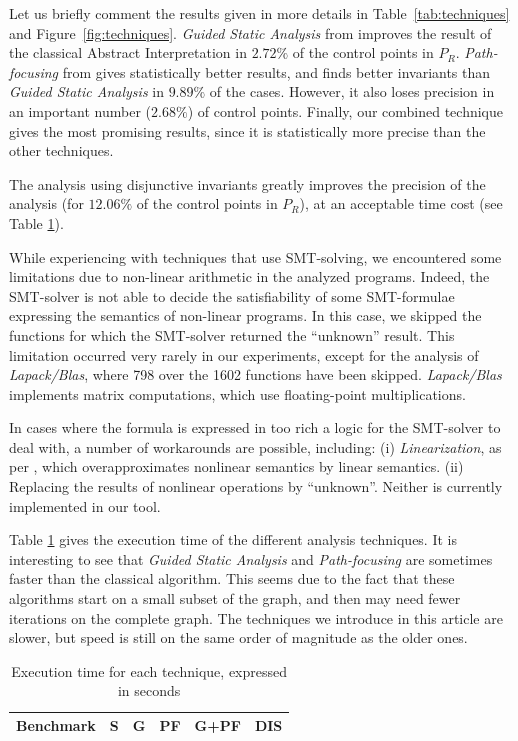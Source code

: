 \documentclass[preprint]{sigplanconf}
\begin{document}
Let us briefly comment the results given in more details in Table~\ref{tab:techniques} and Figure~\ref{fig:techniques}.
\emph{Guided Static Analysis} from \citet{DBLP:conf/sas/GopanR07} improves the
result of the classical Abstract Interpretation in $2.72\%$ of the control points
in $P_R$.
\emph{Path-focusing} from \citet{Monniaux_Gonnord_SAS11} gives
statistically better results, and finds better invariants than \emph{Guided
Static Analysis} in $9.89\%$ of the cases. However, it also loses precision in an
important number ($2.68\%$) of control points.
Finally, our combined technique gives the most promising results, since it is
statistically more precise than the other techniques.

The analysis using disjunctive invariants greatly improves the
precision of the analysis (for $12.06\%$ of the control points in $P_R$), at an
acceptable time cost (see Table \ref{tab:time}).

While experiencing with techniques that use SMT-solving, we encountered some
limitations due to non-linear arithmetic in the analyzed programs. Indeed, 
the SMT-solver is not able to decide the satisfiability of some SMT-formulae
expressing the semantics of non-linear programs. 
In this case, we skipped the functions for which the SMT-solver returned the
``unknown'' result.
This limitation occurred very rarely in our experiments, except for the analysis
of \emph{Lapack/Blas}, where 798 over the 1602 functions have been skipped.
\emph{Lapack/Blas} implements matrix computations, which use floating-point multiplications.

In cases where the formula is expressed in too rich a logic for the SMT-solver to deal with, a number of workarounds are possible, including:
(i) \emph{Linearization}, as per \citet{DBLP:conf/vmcai/Mine06}, which overapproximates nonlinear semantics by linear semantics.
(ii) Replacing the results of nonlinear operations by ``unknown''.
Neither is currently implemented in our tool.

Table \ref{tab:time} gives the execution time of the different analysis
techniques. It is interesting to see that \emph{Guided Static Analysis} and
\emph{Path-focusing} are sometimes faster than the classical
algorithm.
This seems due to the fact that these algorithms start on a small subset
of the graph, and then may need fewer iterations on the complete graph.
The techniques we introduce in this article are slower, but speed is still on the same order of magnitude as the older ones.

\begin{table}[!h]
	\centering
\begin{tabular}{|l|r|r|r|r|r|} \hline
	\multicolumn{1}{|c|}{Benchmark} &
        \multicolumn{1}{c|}{\textbf{S}} &
        \multicolumn{1}{c|}{\textbf{G}} &
        \multicolumn{1}{c|}{\textbf{PF}} &
        \multicolumn{1}{c|}{\textbf{G+PF}} &
	\multicolumn{1}{c|}{\textbf{DIS}} \\ \hline
	 \hline
\end{tabular}
\caption{Execution time for each technique, expressed in seconds}
\label{tab:time}
\end{table}
\end{document}
